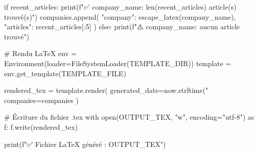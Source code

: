         if recent_articles:
            print(f"✅ {company_name}: {len(recent_articles)} article(s) trouvé(s)")
            companies.append({
                "company": escape_latex(company_name),
                "articles": recent_articles[:5]
            })
        else:
            print(f"⚠️ {company_name}: aucun article trouvé")

# Rendu LaTeX
env = Environment(loader=FileSystemLoader(TEMPLATE_DIR))
template = env.get_template(TEMPLATE_FILE)

rendered_tex = template.render(
    generated_date=now.strftime("%
    companies=companies
)

# Écriture du fichier .tex
with open(OUTPUT_TEX, "w", encoding="utf-8") as f:
    f.write(rendered_tex)

print(f"\n✅ Fichier LaTeX généré : {OUTPUT_TEX}")
